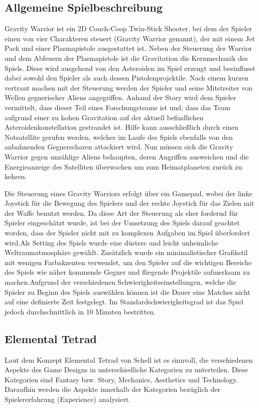 \documentclass[11pt]{scrartcl}
\begin{document}
\subsection{Allgemeine Spielbeschreibung}
Gravity Warrior ist ein 2D Couch-Coop Twin-Stick Shooter, bei dem der Spieler einen von vier Charakteren steuert (Gravity Warrior genannt), der mit einem Jet Pack und einer Plasmapistole ausgestattet ist. Neben der Steuerung der Warrior und dem Abfeuern der Plasmapistole ist die Gravitation die Kernmechanik des Spiels. Diese wird ausgehend von den Asteroiden im Spiel erzeugt und beeinflusst dabei sowohl den Spieler als auch dessen Pistolenprojektile. Nach einem kurzen vertraut machen mit der Steuerung werden der Spieler und seine Mitstreiter von Wellen gegnerischer Aliens angegriffen. Anhand der Story wird dem Spieler vermittelt, dass dieser Teil eines Forschungsteams ist und, dass das Team aufgrund einer zu hohen Gravitation auf der aktuell befindlichen Asteroidenkonstellation gestrandet ist. Hilfe kann ausschließlich durch einen Notsatellite gerufen werden, welcher im Laufe des Spiels ebenfalls von den anbahnenden Gegnerscharen attackiert wird. Nun müssen sich die Gravity Warrior gegen unzählige Aliens behaupten, deren Angriffen ausweichen und die Energieanzeige des Satelliten überwachen um zum Heimatplaneten zurück zu kehren.

Die Steuerung eines Gravity Warriors erfolgt über ein Gamepad, wobei der linke Joystick für die Bewegung des Spielers und der rechte Joystick für das Zielen mit der Waffe benutzt werden. Da diese Art der Steuerung als eher fordernd für Spieler eingeschätzt wurde, ist bei der Umsetzung des Spiels darauf geachtet worden, dass der Spieler nicht mit zu komplexen Aufgaben im Spiel überfordert wird.Als Setting des Spiels wurde eine düstere und leicht unheimliche Weltraumatmosphäre gewählt. Zusätzlich wurde ein minimalistischer Grafikstil mit wenigen Farbakzenten verwendet, um den Spieler auf die wichtigen Bereiche des Spiels wie näher kommende Gegner und fliegende Projektile aufmerksam zu machen.Aufgrund der verschiedenen Schwierigkeitseinstellungen, welche die Spieler zu Beginn des Spiels auswählen können ist die Dauer eine Matches nicht auf eine definierte Zeit festgelegt. Im Standardschwierigkeitsgrad ist das Spiel jedoch durchschnittlich in 10 Minuten bestritten.


\subsection{Elemental Tetrad}
Laut dem Konzept Elemental Tetrad von Schell\cite[~p.41]{S2014} ist es sinnvoll, die verschiedenen Aspekte des Game Designs in unterschiedliche Kategorien zu unterteilen. Diese Kategorien sind Fantasy bzw. Story, Mechanics, Aesthetics und Technology. Daraufhin werden die Aspekte innerhalb der Kategorien bezüglich der Spielererfahrung (Experience) analysiert.
\end{document}
